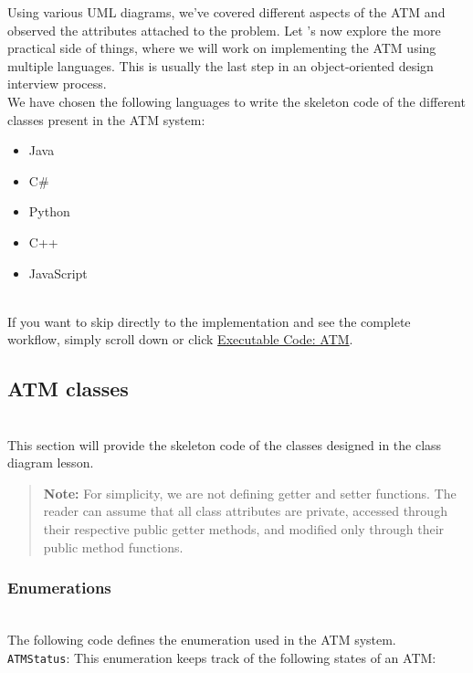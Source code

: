 

Using various UML diagrams, we've covered different aspects of the ATM and observed the attributes attached to the problem. Let 's now explore the more practical side of things, where we will work on implementing the ATM using multiple languages. This is usually the last step in an object-oriented design interview process.
\\
We have chosen the following languages to write the skeleton code of the different classes present in the ATM system:

\begin{itemize}
\item
\protect{}\label{gu67nup9V-AhDIvACfJqX}
Java
\item
\protect{}\label{05cd4rwzyGh7aNNMNpdA_}
C\#
\item
\protect{}\label{nEkBv9aoxxaZo27mzkgqI}
Python
\item
\protect{}\label{ju-U_xv1uoYx9ZaHLSDFo}
C++
\item
\protect{}\label{c3k812o6OsVswnFLdPsI_}
JavaScript
\end{itemize}
\\
If you want to skip directly to the implementation and see the complete workflow, simply scroll down or click \hyperref[Executable-code-ATM]{Executable Code: ATM}.

\subsection{ATM classes}\label{Xh9-PjXpaF0EP8T9p-cME}
\\
This section will provide the skeleton code of the classes designed in the class diagram lesson.
\begin{quote}
\textbf{Note:} For simplicity, we are not defining getter and setter functions. The reader can assume that all class attributes are private, accessed through their respective public getter methods, and modified only through their public method functions.
\end{quote}
\subsubsection{Enumerations}\label{mJSDxUVvFp8Y_9_PFWSgy}
\\
The following code defines the enumeration used in the ATM system.
\\
\texttt{ATMStatus}: This enumeration keeps track of the following states of an ATM:


